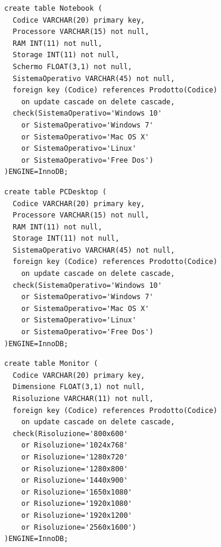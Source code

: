 \begin{verbatim}
create table Notebook (
  Codice VARCHAR(20) primary key,
  Processore VARCHAR(15) not null,
  RAM INT(11) not null,
  Storage INT(11) not null,
  Schermo FLOAT(3,1) not null,
  SistemaOperativo VARCHAR(45) not null,
  foreign key (Codice) references Prodotto(Codice)
    on update cascade on delete cascade,
  check(SistemaOperativo='Windows 10'
    or SistemaOperativo='Windows 7'
    or SistemaOperativo='Mac OS X'
    or SistemaOperativo='Linux'
    or SistemaOperativo='Free Dos')
)ENGINE=InnoDB;
\end{verbatim}
\vspace{0.5cm}

\noindent{}
\newline\newline

\begin{verbatim}
create table PCDesktop (
  Codice VARCHAR(20) primary key,
  Processore VARCHAR(15) not null,
  RAM INT(11) not null,
  Storage INT(11) not null,
  SistemaOperativo VARCHAR(45) not null,
  foreign key (Codice) references Prodotto(Codice)
    on update cascade on delete cascade,
  check(SistemaOperativo='Windows 10'
    or SistemaOperativo='Windows 7'
    or SistemaOperativo='Mac OS X'
    or SistemaOperativo='Linux'
    or SistemaOperativo='Free Dos')
)ENGINE=InnoDB;
\end{verbatim}
\vspace{0.5cm}

\noindent{}
\newline\newline

\begin{verbatim}
create table Monitor (
  Codice VARCHAR(20) primary key,
  Dimensione FLOAT(3,1) not null,
  Risoluzione VARCHAR(11) not null,
  foreign key (Codice) references Prodotto(Codice)
    on update cascade on delete cascade,
  check(Risoluzione='800x600'
    or Risoluzione='1024x768'
    or Risoluzione='1280x720'
    or Risoluzione='1280x800'
    or Risoluzione='1440x900'
    or Risoluzione='1650x1080'
    or Risoluzione='1920x1080'
    or Risoluzione='1920x1200'
    or Risoluzione='2560x1600')
)ENGINE=InnoDB;
\end{verbatim}
\vspace{0.5cm}

